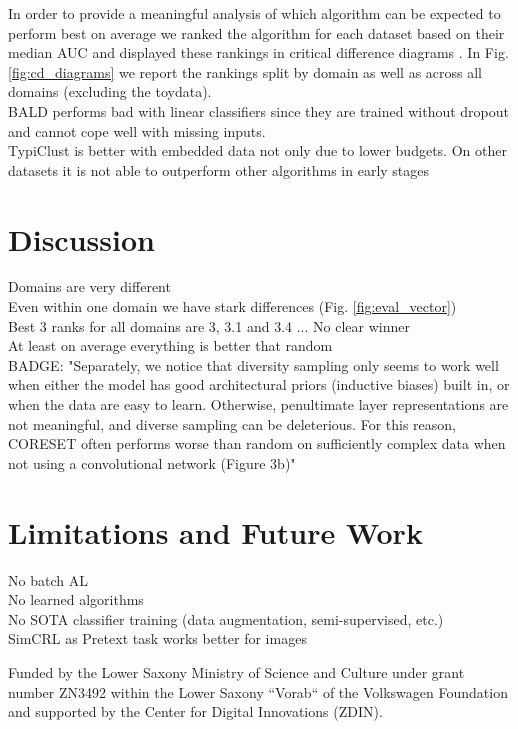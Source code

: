 \documentclass[]{article}
\begin{document}
In order to provide a meaningful analysis of which algorithm can be expected to perform best on average we ranked the algorithm for each dataset based on their median AUC and displayed these rankings in critical difference diagrams \cite{IsmailFawaz2018deep}.
In Fig. \ref{fig:cd_diagrams} we report the rankings split by domain as well as across all domains (excluding the toydata). \\ [2mm]
%
BALD performs bad with linear classifiers since they are trained without dropout and cannot cope well with missing inputs. \\
TypiClust is better with embedded data not only due to lower budgets. On other datasets it is not able to outperform other algorithms in early stages


\section{Discussion}
Domains are very different \\
Even within one domain we have stark differences (Fig. \ref{fig:eval_vector}) \\
Best 3 ranks for all domains are 3, 3.1 and 3.4 ... No clear winner \\
At least on average everything is better that random \\
BADGE: "Separately, we notice that diversity sampling only seems to work well when either the model has good architectural priors (inductive biases) built in, or when the data are easy to learn. Otherwise, penultimate layer representations are not meaningful, and diverse sampling can be deleterious. For this reason, CORESET often performs worse than random on sufficiently complex data when not using a convolutional network (Figure 3b)" \\

\section{Limitations and Future Work}
No batch AL \\
No learned algorithms \\
No SOTA classifier training (data augmentation, semi-supervised, etc.) \\
SimCRL as Pretext task works better for images

\newpage

\begin{ack}
	Funded by the Lower Saxony Ministry of Science and Culture under grant number ZN3492 within the Lower Saxony “Vorab“ of the Volkswagen Foundation and supported by the Center for Digital Innovations (ZDIN).
\end{ack}
\end{document}
